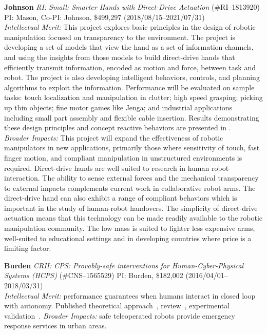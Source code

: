 \documentclass[11pt]{article}
\begin{document}
\noindent\textbf{Johnson}
\emph{RI: Small: Smarter Hands with Direct-Drive Actuation} 
(\#RI--1813920) PI: Mason, Co-PI: Johnson, \$499,297 (2018/08/15--2021/07/31) \\
{\it Intellectual Merit:} This project explores basic principles in the design of robotic manipulation focused on transparency to the environment. The project is developing a set of models that view the hand as a set of information channels, and using the insights from
those models to build direct-drive hands that efficiently transmit information, encoded as motion and force, between task
and robot. The project is also developing intelligent behaviors, controls, and planning algorithms to exploit
the information. Performance will be evaluated on sample tasks: touch localization and manipulation in
clutter; high speed grasping; picking up thin objects; fine motor games like Jenga; and industrial applications
including small part assembly and flexible cable insertion. Results demonstrating these design principles and concept reactive behaviors are presented in \cite{paper:bhatia-direct-2019}.\\
{\it Broader Impacts:}  This project will expand the effectiveness of robotic manipulators in new applications,
primarily those where sensitivity of touch, fast finger motion, and compliant manipulation in
unstructured environments is required. Direct-drive hands are well suited to research in human robot interaction. The ability to sense external
forces and the mechanical transparency to external impacts complements current work in collaborative robot
arms. The direct-drive hand can also exhibit a range of compliant behaviors which is important in the study
of human-robot handovers.
The simplicity of direct-drive actuation means that this technology can be made readily available to
the robotic manipulation community. The low mass is suited to lighter less expensive arms, well-suited to
educational settings and in developing countries where price is a limiting factor.

\noindent\textbf{Burden}
\emph{CRII: CPS: Provably-safe interventions for Human-Cyber-Physical Systems (HCPS)} 
(\#CNS--1565529) PI: Burden, \$182,002 (2016/04/01--2018/03/31) \\
{\it Intellectual Merit:}  performance guarantees when humans interact in closed loop with autonomy.
Published theoretical approach~\cite{Robinson2016-qh}, review~\cite{Nothwang2016-jj}, experimental validation~\cite{Roth2017-jp, Yamagami2018-nm}.
{\it Broader Impacts:}  safe teleoperated robots provide emergency response services in urban areas.
\end{document}
